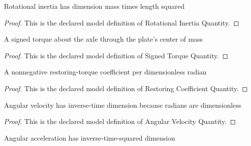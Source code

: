 \begin{definition}
  \label{def:physics:phyx-mini-0269:phyxminiproblems-problemphyxmini0269-rotationalinertiaquantity}
  Rotational inertia has dimension mass times length squared
\end{definition}
\begin{proof}
  This is the declared model definition of Rotational Inertia Quantity.
\end{proof}
\begin{definition}
  \label{def:physics:phyx-mini-0269:phyxminiproblems-problemphyxmini0269-signedtorquequantity}
  A signed torque about the axle through the plate's center of mass
\end{definition}
\begin{proof}
  This is the declared model definition of Signed Torque Quantity.
\end{proof}
\begin{definition}
  \label{def:physics:phyx-mini-0269:phyxminiproblems-problemphyxmini0269-restoringcoefficientquantity}
  A nonnegative restoring-torque coefficient per dimensionless radian
\end{definition}
\begin{proof}
  This is the declared model definition of Restoring Coefficient Quantity.
\end{proof}
\begin{definition}
  \label{def:physics:phyx-mini-0269:phyxminiproblems-problemphyxmini0269-angularvelocityquantity}
  Angular velocity has inverse-time dimension because radians are dimensionless
\end{definition}
\begin{proof}
  This is the declared model definition of Angular Velocity Quantity.
\end{proof}
\begin{definition}
  \label{def:physics:phyx-mini-0269:phyxminiproblems-problemphyxmini0269-angularaccelerationquantity}
  Angular acceleration has inverse-time-squared dimension
\end{definition}
